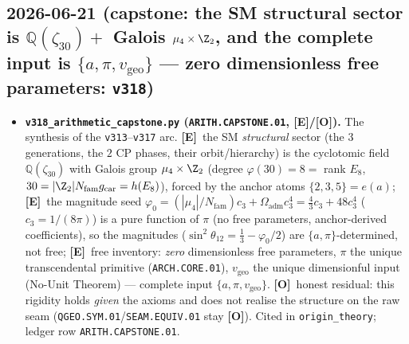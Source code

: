 \documentclass[11pt]{article}
\providecommand{\mE}{\textbf{[E]}}\providecommand{\mC}{\textbf{[C]}}
\providecommand{\mO}{\textbf{[O]}}\providecommand{\mX}{\textbf{[X]}}
\providecommand{\gcar}{g_{\mathrm{car}}}\providecommand{\Nfam}{N_{\mathrm{fam}}}
\begin{document}
\subsection*{2026-06-21 (capstone: the SM structural sector is $\mathbb Q(\zeta_{30})+$ Galois $\mu_4\times\Z_2$, and the complete input is $\{a,\pi,v_{\mathrm{geo}}\}$ --- zero dimensionless free parameters: \texttt{v318})}
\begin{itemize}
\item \textbf{\texttt{v318\_arithmetic\_capstone.py} (\texttt{ARITH.CAPSTONE.01}, \mE/\mO).} The synthesis of the
  \texttt{v313}--\texttt{v317} arc. \mE\ the SM \emph{structural} sector (the $3$ generations, the $2$ CP phases,
  their orbit/hierarchy) is the cyclotomic field $\mathbb Q(\zeta_{30})$ with Galois group $\mu_4\times\Z_2$ (degree
  $\varphi(30)=8=$ rank $E_8$, $30=|\Z_2|\Nfam\gcar=h(E_8)$), forced by the anchor atoms $\{2,3,5\}=e(a)$; \mE\ the
  magnitude seed $\varphi_0=(|\mu_4|/\Nfam)c_3+\Omega_{\mathrm{adm}}c_3^4=\tfrac43 c_3+48 c_3^4$ ($c_3=1/(8\pi)$) is a
  pure function of $\pi$ (no free parameters, anchor-derived coefficients), so the magnitudes
  ($\sin^2\theta_{12}=\tfrac13-\varphi_0/2$) are $\{a,\pi\}$-determined, not free; \mE\ free inventory: \emph{zero}
  dimensionless free parameters, $\pi$ the unique transcendental primitive (\texttt{ARCH.CORE.01}), $v_{\mathrm{geo}}$
  the unique dimensionful input (No-Unit Theorem) --- complete input $\{a,\pi,v_{\mathrm{geo}}\}$. \mO\ honest
  residual: this rigidity holds \emph{given} the axioms and does not realise the structure on the raw seam
  (\texttt{QGEO.SYM.01}/\texttt{SEAM.EQUIV.01} stay \mO). Cited in \texttt{origin\_theory}; ledger row
  \texttt{ARITH.CAPSTONE.01}.
\end{itemize}
\end{document}
